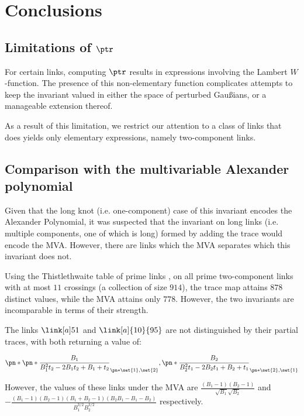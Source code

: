 \chapter{Conclusions}\label{ch:conclusions}

\section{Limitations of $\ptr$}\label{sec:limitations}
For certain links, computing $\ptr$ results in expressions involving the Lambert
$W$-function. The presence of this non-elementary function complicates attempts
to keep the invariant valued in either the space of perturbed Gaußians, or a
manageable extension thereof.

As a result of this limitation, we restrict our attention to a class of links
that does yields only elementary expressions, namely two-component links.

\section{Comparison with the multivariable Alexander polynomial}
\label{sec:compare_MVA}

Given that the long knot (i.e. one-component) case of this invariant
encodes the Alexander Polynomial, it was suspected that the invariant on long
links (i.e. multiple components, one of which is long) formed by adding the
trace would encode the \ac{MVA}. However, there are links which the \ac{MVA}
separates which this invariant does not.

Using the Thistlethwaite table of prime links \cite{knotatlas}, on all prime
two-component links with at most $11$ crossings (a collection of size $914$),
the trace map attains $878$ distinct values, while the MVA attains only $778$.
However, the two invariants are incomparable in terms of their strength.

The links $\link[a]51$ and $\link[a]{10}{95}$ are not distinguished by their
partial traces, with both returning a value of:

\begin{equation}
        \pn*{
                \pn*{
                        \frac{B_1}{B_1^2 t_2 -2 B_1 t_2 +B_1+t_2}
                }_{\pn*{\set{1},\set{2}}},
                \pn*{
                        \frac{B_2}{B_2^2 t_1 -2 B_2 t_1 +B_2+t_1}
                }_{\pn*{\set{2},\set{1}}}
}
\end{equation}

However, the values of these links under the \ac{MVA} are
$\frac{\left(B_1-1\right) \left(B_2-1\right)}{\sqrt{B_1} \sqrt{B_2}}
$ and $-\frac{\left(B_1-1\right) \left(B_2-1\right) \left(B_1+B_2-1\right)
        \left(B_2 B_1-B_1-B_2\right)}{B_1^{3/2} B_2^{3/2}}$ respectively.

